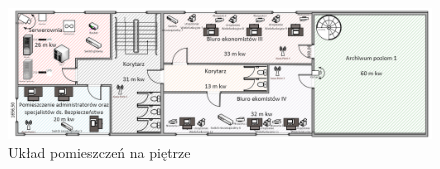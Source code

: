 \begin{landscape}
	\begin{figure}[!h]
		\vspace{3cm}
		\includegraphics[width=24cm]{uklad_pomieszczen_poziom1.png}
		\caption{Układ pomieszczeń na piętrze}
		\label{schemat:uklad_pomieszczen_poziom1}
	\end{figure}
\end{landscape}

\newpage
